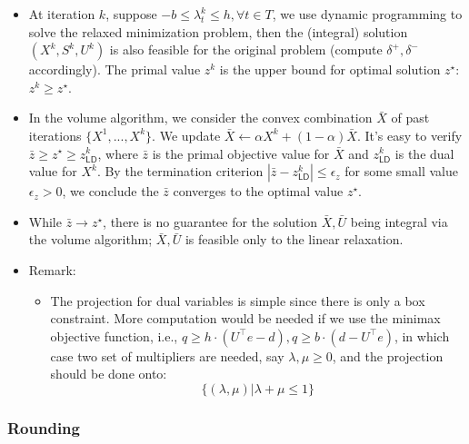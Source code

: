 \documentclass[
  a4paper,
,tablecaptionabove
]{scrartcl}
\numberwithin{equation}{section}
\providecommand{\tightlist}{%
  \setlength{\itemsep}{0pt}\setlength{\parskip}{0pt}}
\begin{document}
\begin{itemize}
  \item
        At iteration \(k\), suppose
        \(-b \le \lambda^k_t \le h, \forall t \in T\), we use dynamic
        programming to solve the relaxed minimization problem, then the
        (integral) solution \(( X^k, S^k, U^k)\) is also feasible for the
        original problem (compute \(\delta^+, \delta^-\) accordingly). The
        primal value \(z^k\) is the upper bound for optimal solution
        \(z^\star\): \(z^k\ge z^\star\).
  \item
        In the volume algorithm, we consider the convex combination \(\bar X\)
        of past iterations \(\{X^1, ..., X^k\}\). We update
        \(\bar X \leftarrow \alpha X^k + (1-\alpha) \bar X\). It's easy to
        verify \(\bar z \ge z^\star \ge z_{\textsf{LD}}^k\), where \(\bar z\)
        is the primal objective value for \(\bar X\) and \(z_{\textsf{LD}}^k\)
        is the dual value for \(X^k\). By the termination criterion
        \(|\bar z - z_{\textsf{LD}}^k| \le \epsilon_z\) for some small value
        \(\epsilon_z >0\), we conclude the \(\bar z\) converges to the optimal
        value \(z^\star\).
  \item
        While \(\bar z \to z^\star\), there is no guarantee for the solution
        \(\bar X, \bar U\) being integral via the volume algorithm;
        \(\bar X, \bar U\) is feasible only to the linear relaxation.
  \item
        Remark:

        \begin{itemize}
          \tightlist
          \item
                The projection for dual variables is simple since there is only a
                box constraint. More computation would be needed if we use the
                minimax objective function, i.e.,
                \(q \ge h\cdot (U^\top e - d), q\ge b\cdot (d-U^\top e)\), in which
                case two set of multipliers are needed, say \(\lambda, \mu \ge 0\),
                and the projection should be done onto:
                \[\{(\lambda,\mu)|\lambda +\mu \le 1\}\]
        \end{itemize}
\end{itemize}

\hypertarget{rounding}{%
  \subsubsection{Rounding}\label{rounding}}
\end{document}
